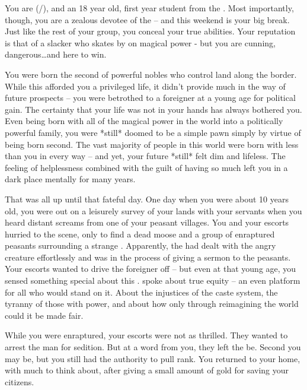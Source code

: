 \documentclass[char]{GL2020}
\begin{document}
\name{\cChupStudent{}}
 
You are \cChupStudent{} (\cChupStudent{\they}/\cChupStudent{\them}), and an 18 year old, first year student from the \pFarm{}. Most importantly, though, you are a zealous devotee of the \pGoaties{} -- and this weekend is your big break. Just like the rest of your group, you conceal your true abilities. Your reputation is that of a slacker who skates by on \cChupStudent{\their} magical power - but you are cunning, dangerous\ldots and here to win.
 
You were born the second \cChupStudent{\child} of powerful nobles who control land along the \pTech{} border. While this afforded you a privileged life, it didn’t provide much in the way of future prospects -- you were betrothed to a foreigner at a young age for political gain. The certainty that your life was not in your hands has always bothered you. Even being born with all of the magical power in the world into a politically powerful family, you were *still* doomed to be a simple pawn simply by virtue of being born second. The vast majority of people in this world were born with less than you in every way -- and yet, your future *still* felt dim and lifeless. The feeling of helplessness combined with the guilt of having so much left you in a dark place mentally for many years.
 
That was all up until that fateful day. One day when you were about 10 years old, you were out on a leisurely survey of your lands with your servants when you heard distant screams from one of your peasant villages. You and your escorts hurried to the scene, only to find a dead moose and a group of enraptured peasants surrounding a strange \cChupLeader{\person}. Apparently, the \cChupLeader{\person}had dealt with the angry creature effortlessly and was in the process of giving a sermon to the peasants. Your escorts wanted to drive the foreigner off -- but even at that young age, you sensed something special about this \cChupLeader{\person}. \cChupLeader{\They} spoke about true equity -- an even platform for all who would stand on it. About the injustices of the caste system, the tyranny of those with power, and about how only through reimagining the world could it be made fair. 
 
While you were enraptured, your escorts were not as thrilled. They wanted to arrest the man for sedition. But at a word from you, they left the \cChupLeader{\person}be. Second \cChupStudent{\child} you may be, but you still had the authority to pull rank. You returned to your home, with much to think about, after giving \cChupLeader{\them} a small amount of gold for saving your citizens.
 
\end{document}
